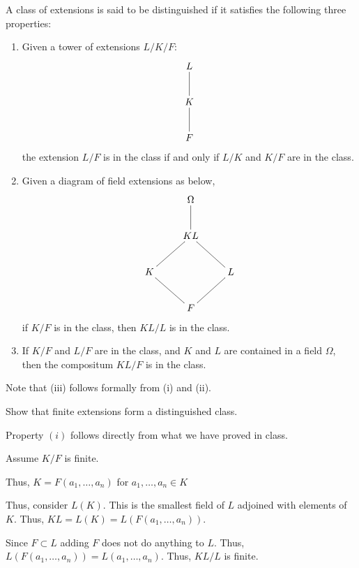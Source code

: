 \documentclass[12pt, letterpaper]{article}
\begin{document}
\begin{problem}{}
    A class of extensions is said to be distinguished if it satisfies the following
three properties:
\begin{enumerate}
\item[i.] Given a tower of extensions $L/K/F$:
\begin{equation*}
\xymatrix{
L\ar@{-}[d]\\
K\ar@{-}[d]\\
F
}
\end{equation*}
the extension $L/F$ is in the class if and only if $L/K$ and $K/F$ are in the
class.
\item[ii.] Given a diagram of field extensions as below,
\begin{equation*}
\xymatrix{
& \Omega\ar@{-}[d]\\
& KL\ar@{-}[dl]\ar@{-}[dr] &\\
K\ar@{-}[dr] & & L\ar@{-}[dl]\\
& F &
}
\end{equation*}
if $K/F$ is in the class, then $KL/L$ is in the class.
\item[iii.] If $K/F$ and $L/F$ are in the class, and $K$ and $L$ are contained in a
field $\Omega$, then the compositum $KL/F$ is in the class.
\end{enumerate}
Note that (iii) follows formally from (i) and (ii).
\end{problem}

\begin{subproblem}{}
    Show that finite extensions form a distinguished class.
\end{subproblem}
\begin{problemproof}
    Property $(i)$ follows directly from what we have proved in class.

    Assume $K/F$ is finite.

    Thus, $K=F(a_1,\dots,a_n)$ for $a_1,\dots,a_n \in K$

    Thus, consider $L(K)$. This is the smallest field of $L$ adjoined with elements of $K$. Thus, $KL=L(K)=L(F(a_1,\dots,a_n))$.

    Since $F \subset L$ adding $F$ does not do anything to $L$. Thus, $L(F(a_1,\dots,a_n))=L(a_1,\dots,a_n)$. Thus, $KL/L$ is finite.
\end{problemproof}
\end{document}
